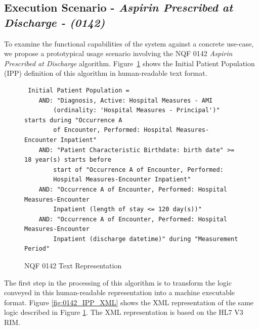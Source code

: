 \documentclass{amia}
\begin{document}
\subsection*{Execution Scenario - \textit{Aspirin Prescribed at Discharge - (0142)}}
To examine the functional capabilities of the system against a concrete use-case, we propose a prototypical usage scenario involving the NQF 0142 \textit{Aspirin Prescribed at Discharge} algorithm. Figure~\ref{fig:0142_IPP_text} shows the Initial Patient Population (IPP) definition of this algorithm in human-readable text format.

\begin{figure}[H]
\begin{verbatim}
 Initial Patient Population =
    AND: "Diagnosis, Active: Hospital Measures - AMI 
        (ordinality: 'Hospital Measures - Principal')" starts during "Occurrence A
        of Encounter, Performed: Hospital Measures-Encounter Inpatient"
    AND: "Patient Characteristic Birthdate: birth date" >= 18 year(s) starts before
        start of "Occurrence A of Encounter, Performed: 
        Hospital Measures-Encounter Inpatient"
    AND: "Occurrence A of Encounter, Performed: Hospital Measures-Encounter
        Inpatient (length of stay <= 120 day(s))"
    AND: "Occurrence A of Encounter, Performed: Hospital Measures-Encounter
        Inpatient (discharge datetime)" during "Measurement Period"
\end{verbatim}
\caption{NQF 0142 Text Representation} 
\label{fig:0142_IPP_text}
\end{figure}

The first step in the processing of this algorithm is to transform the logic conveyed in this human-readable representation into a machine executable format. Figure \ref{fig:0142_IPP_XML} shows the XML representation of the same logic described in Figure \ref{fig:0142_IPP_text}. The XML representation is based on the HL7 V3 RIM\cite{..hl7 citation here}.
\end{document}
